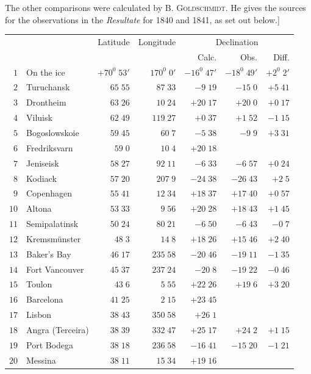 The other comparisons were calculated by \textsc{B. Goldschmidt}. He gives the sources for the observations in the \textit{Resultate} for 1840 and 1841, as set out below.]
\clearpage
{}
\begingroup
\fontsize{9}{10.2}\selectfont
\setlength{\tabcolsep}{1.5pt}
\renewcommand{\arraystretch}{1.02}
\begin{center}
\begin{tabular}{rl|r|r||r|r|r}
\hline
&&Latitude&Longitude&\multicolumn{3}{c}{Declination}\\
&&&&Calc.&Obs.&Diff.\\\hline
$1$&On the ice&$+70^0\;53'$&$170^0\;0'$&$-16^0\;47'$&$-18^0\;49'$&$+2^0\;2'$\\
$2$&Turuchansk&$65\;55$&$87\;33$&$-9\;19$&$-15\;0$&$+5\;41$\\
$3$&Drontheim&$63\;26$&$10\;24$&$+20\;17$&$+20\;0$&$+0\;17$\\
$4$&Viluisk&$62\;49$&$119\;27$&$+0\;37$&$+1\;52$&$-1\;15$\\
$5$&Bogoslowskoie&$59\;45$&$60\;7$&$-5\;38$&$-9\;9$&$+3\;31$\\
$6$&Fredriksvarn&$59\;0$&$10\;4$&$+20\;18$&&\\
$7$&Jeniseisk&$58\;27$&$92\;11$&$-6\;33$&$-6\;57$&$+0\;24$\\
$8$&Kodiack&$57\;20$&$207\;9$&$-24\;38$&$-26\;43$&$+2\;5$\\
$9$&Copenhagen&$55\;41$&$12\;34$&$+18\;37$&$+17\;40$&$+0\;57$\\
$10$&Altona&$53\;33$&$9\;56$&$+20\;28$&$+18\;43$&$+1\;45$\\[2pt]
$11$&Semipalatinsk&$50\;24$&$80\;21$&$-6\;50$&$-6\;43$&$-0\;7$\\
$12$&Kremsmünster&$48\;3$&$14\;8$&$+18\;26$&$+15\;46$&$+2\;40$\\
$13$&Baker’s Bay&$46\;17$&$235\;58$&$-20\;46$&$-19\;11$&$-1\;35$\\
$14$&Fort Vancouver&$45\;37$&$237\;24$&$-20\;8$&$-19\;22$&$-0\;46$\\
$15$&Toulon&$43\;6$&$5\;55$&$+22\;26$&$+19\;6$&$+3\;20$\\
$16$&Barcelona&$41\;25$&$2\;15$&$+23\;45$&&\\
$17$&Lisbon&$38\;43$&$350\;58$&$+26\;1$&&\\
$18$&Angra (Terceira)&$38\;39$&$332\;47$&$+25\;17$&$+24\;2$&$+1\;15$\\
$19$&Port Bodega&$38\;18$&$236\;58$&$-16\;41$&$-15\;20$&$-1\;21$\\
$20$&Messina&$38\;11$&$15\;34$&$+19\;16$&&\\[2pt]

\end{tabular}
\end{center}
